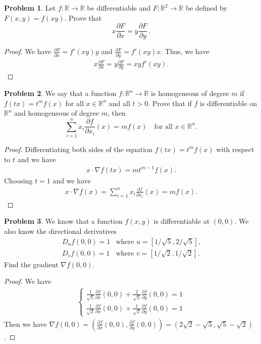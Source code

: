 \documentclass[11pt]{article}
\theoremstyle{definition}
\newtheorem{problem}{Problem}
\theoremstyle{definition}
\begin{document}
\medskip

\begin{problem}
Let $f:\mathbb{R}\to\mathbb{R}$ be differentiable and $F:\mathbb{R}^2\to\mathbb{R}$ be defined by
$F(x,y)=f(xy)$. Prove that
$$
x\frac{\partial F}{\partial x}=y\frac{\partial F}{\partial y}\, .
$$
\end{problem}
\begin{proof}
We have $\frac{\partial F}{\partial x} = f'(xy)y$ and $\frac{\partial F}{\partial y} = f'(xy)x$. Thus, we have 
\begin{align*}
    x\frac{\partial F}{\partial x} = y\frac{\partial F}{\partial y} = xy f'(xy).
\end{align*}
\end{proof}

\medskip

\begin{problem}
We say that a function $f:\mathbb{R}^n\to\mathbb{R}$ is homogeneous of degree $m$ if
$f(tx)=t^mf(x)$ for all $x\in\mathbb{R}^n$ and all $t>0$.
Prove that if $f$ is differentiable on $\mathbb{R}^n$ and homogeneous of
degree $m$, then
$$
\sum_{i=1}^n x_i\frac{\partial f}{\partial x_i}(x) = mf(x)
\quad
\mbox{for all $x\in\mathbb{R}^n$.}
$$
\end{problem}
\begin{proof}
Differentiating both sides of the equation $f(tx)=t^mf(x)$ with respect to $t$ and we have
\begin{align*}
    x \cdot \nabla f(tx) = m t^{m-1} f(x).
\end{align*}
Choosing $t = 1$ and we have 
\begin{align*}
    x \cdot \nabla f(x) = \sum^n_{i=1} x_i \frac{\partial f}{\partial x_i}(x) = m f(x).
\end{align*}
\end{proof}

\medskip

\begin{problem}
We know that a function $f(x,y)$ is differentiable at $(0,0)$. We also know the
directional derivatives
$$
\begin{array}{ccc}
D_uf(0,0)=1    & \mbox{where $u=[1/\sqrt{5},2/\sqrt{5}]$,}\\
D_vf(0,0)=1 &   \mbox{where $v=[1/\sqrt{2},1/\sqrt{2}]$}.
\end{array}
$$
Find the gradient $\nabla f(0,0)$.
\end{problem}
\begin{proof}
We have 
\begin{align*}
    \left\{
    \begin{aligned}
        \frac{1}{\sqrt{5}}\frac{\partial f}{\partial x}(0,0) + \frac{2}{\sqrt{5}}\frac{\partial f}{\partial y}(0,0) = 1\\
        \frac{1}{\sqrt{2}}\frac{\partial f}{\partial x}(0,0) + \frac{1}{\sqrt{2}}\frac{\partial f}{\partial y}(0,0) = 1
    \end{aligned}
    \right.
\end{align*}
Then we have $\nabla f(0,0) = \left(\frac{\partial f}{\partial x}(0,0), \frac{\partial f}{\partial y}(0,0) \right) = \left(2\sqrt{2}-\sqrt{5}, \sqrt{5}-\sqrt{2} \right)$.
\end{proof}
\end{document}
